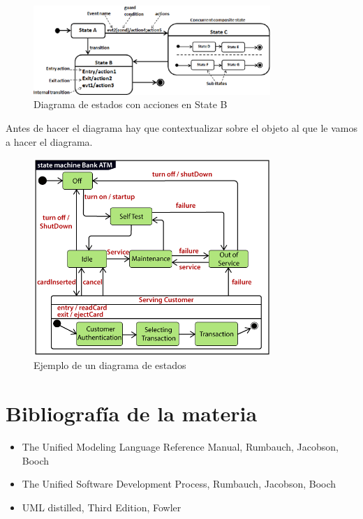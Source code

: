 \documentclass[titlepage,a4paper]{article}
\begin{document}
\begin{figure}[!htb]
    \centering
    \includegraphics[width=0.8\textwidth]{Imagenes/StateDiagramWithActions.png}
    \caption{Diagrama de estados con acciones en State B}
\end{figure}

Antes de hacer el diagrama hay que contextualizar sobre el objeto al que le vamos a hacer el diagrama.

\begin{figure}[!htb]
    \centering
    \includegraphics[width=0.8\textwidth]{Imagenes/StateDiagramExample.png}
    \caption{Ejemplo de un diagrama de estados}
\end{figure}




\newpage

\section{Bibliografía de la materia}

\begin{itemize}
    \item The Unified Modeling Language Reference Manual, Rumbauch, Jacobson, Booch
    \item The Unified Software Development Process, Rumbauch, Jacobson, Booch
    \item UML distilled, Third Edition, Fowler
\end{itemize}
\end{document}
